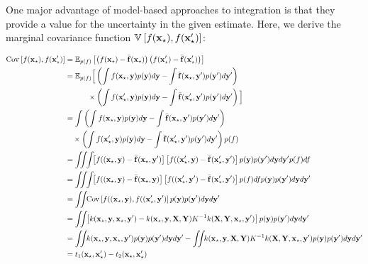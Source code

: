 One major advantage of model-based approaches to integration is that they provide a value for the uncertainty in the given estimate.  Here, we derive the marginal covariance function $\mathbb{V}_{} \left[ {f({\bf{x}}_\star), f({\bf{x}}_\star')} \right]$:

\begin{align}
\covarianceargs{}{f(\vx\st), f(\vx\st')} & = \expectargs{p(f)}{ \left( f(\vx\st) - \mf(\vx\st) \right)\left( f(\vx\st') - \mf(\vx\st') \right)}\\
 & = \expect_{p(f)} \Big[ \left( \int f(\vx\st, \vy) p(\vy) d\vy - \int \mf(\vx\st, \vy') p(\vy') d\vy' \right) \\
   & \qquad \quad \times \left( \int f(\vx\st', \vy) p(\vy) d\vy - \int \mf(\vx\st', \vy') p(\vy') d\vy' \right) \Big]\\
 & = \int \left( \int f(\vx\st, \vy) p(\vy) d\vy - \int \mf(\vx\st, \vy') p(\vy') d\vy' \right) \\
   & \quad \times \left( \int f(\vx\st', \vy) p(\vy) d\vy - \int \mf(\vx\st', \vy') p(\vy') d\vy' \right) p(f) \\
& = \int\!\!\! \int\!\! \int\!\! \left[ f((\vx\st, \vy) - \mf(\vx\st, \vy') \right]  \left[ f((\vx\st', \vy) - \mf(\vx\st', \vy') \right] p(\vy) p(\vy') d\vy d\vy' p(f) df \\
& = \int\!\!\! \int\!\! \int\!\! \left[ f((\vx\st, \vy) - \mf(\vx\st, \vy) \right]  \left[ f((\vx\st', \vy') - \mf(\vx\st', \vy') \right] p(f) df p(\vy) p(\vy') d\vy d\vy' \\
& = \int\!\! \!\int\!\! \Cov \left[ f((\vx\st, \vy), f((\vx\st', \vy') \right] p(\vy) p(\vy') d\vy d\vy' \\
& = \int\!\!\! \int\!\! \left[ k(\vx\st, \vy, \vx\st, \vy') - k(\vx\st, \vy, \vX, \vY) K^{-1} k(\vX, \vY, \vx\st, \vy') \right] p(\vy) p(\vy') d\vy d\vy' \\
& = \int\!\!\! \int\!\! k(\vx\st, \vy, \vx\st, \vy') p(\vy) p(\vy') d\vy d\vy' - \int\!\!\! \int\!\! k(\vx\st, \vy, \vX, \vY) K^{-1} k(\vX, \vY, \vx\st, \vy') p(\vy) p(\vy') d\vy d\vy' \\
& = t_1(\vx\st, \vx\st') - t_2(\vx\st, \vx\st')
\label{eq:marg_var_symbolic}
\end{align} 
